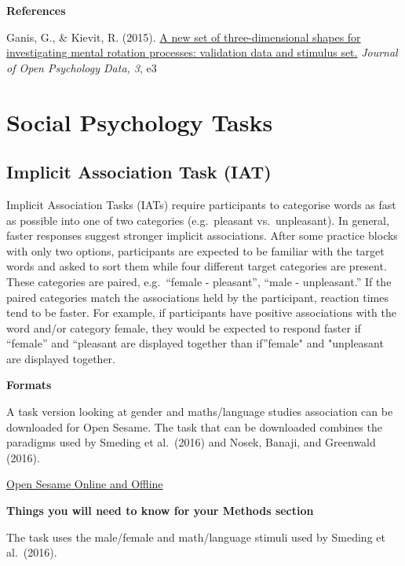 \documentclass[
]{book}
\begin{document}
\textbf{References}

Ganis, G., \& Kievit, R. (2015). \href{https://openpsychologydata.metajnl.com/articles/10.5334/jopd.ai/}{A new set of three-dimensional shapes for investigating mental rotation processes: validation data and stimulus set.} \emph{Journal of Open Psychology Data, 3}, e3

\hypertarget{social-psychology-tasks}{%
\chapter{Social Psychology Tasks}\label{social-psychology-tasks}}

\hypertarget{implicit-association-task-iat}{%
\section{Implicit Association Task (IAT)}\label{implicit-association-task-iat}}

Implicit Association Tasks (IATs) require participants to categorise words as fast as possible into one of two categories (e.g.~pleasant vs.~unpleasant). In general, faster responses suggest stronger implicit associations. After some practice blocks with only two options, participants are expected to be familiar with the target words and asked to sort them while four different target categories are present. These categories are paired, e.g.~``female - pleasant'', ``male - unpleasant.'' If the paired categories match the associations held by the participant, reaction times tend to be faster. For example, if participants have positive associations with the word and/or category female, they would be expected to respond faster if ``female'' and ``pleasant are displayed together than if''female" and "unpleasant are displayed together.

\textbf{Formats}

A task version looking at gender and maths/language studies association can be downloaded for Open Sesame. The task that can be downloaded combines the paradigms used by Smeding et al.~(2016) and Nosek, Banaji, and Greenwald (2016).

\href{https://github.com/jmattschey/MScConversionExperiments/blob/master/GitHub/ImplicitAssociationTask.zip}{Open Sesame Online and Offline}

\textbf{Things you will need to know for your Methods section}

The task uses the male/female and math/language stimuli used by Smeding et al.~(2016).
\end{document}
